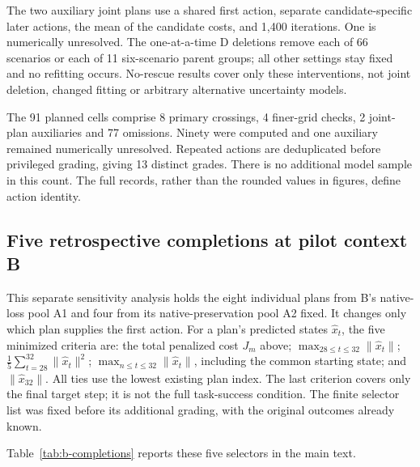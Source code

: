 The two auxiliary joint plans use a shared first action, separate candidate-specific later actions, the mean of the candidate costs, and 1,400 iterations. One is numerically unresolved. The one-at-a-time D deletions remove each of 66 scenarios or each of 11 six-scenario parent groups; all other settings stay fixed and no refitting occurs. No-rescue results cover only these interventions, not joint deletion, changed fitting or arbitrary alternative uncertainty models.

The 91 planned cells comprise 8 primary crossings, 4 finer-grid checks, 2 joint-plan auxiliaries and 77 omissions. Ninety were computed and one auxiliary remained numerically unresolved. Repeated actions are deduplicated before privileged grading, giving 13 distinct grades. There is no additional model sample in this count. The full records, rather than the rounded values in figures, define action identity.

\subsection{Five retrospective completions at pilot context B}
\label{app:b-completions}
This separate sensitivity analysis holds the eight individual plans from
B's native-loss pool A1 and four from its native-preservation pool A2 fixed.
It changes only which plan
supplies the first action. For a plan's predicted states $\hat x_t$, the
five minimized criteria are: the total penalized cost $J_m$ above;
$\max_{28\leq t\leq32}\|\hat x_t\|$;
$\tfrac15\sum_{t=28}^{32}\|\hat x_t\|^2$;
$\max_{n\leq t\leq32}\|\hat x_t\|$, including the common starting state;
and $\|\hat x_{32}\|$. All ties use the lowest existing plan index.
The last criterion covers only the final target step; it is not the full
task-success condition. The finite selector list was fixed before its
additional grading, with the original outcomes already known.

Table~\ref{tab:b-completions} reports these five selectors in the main text.


